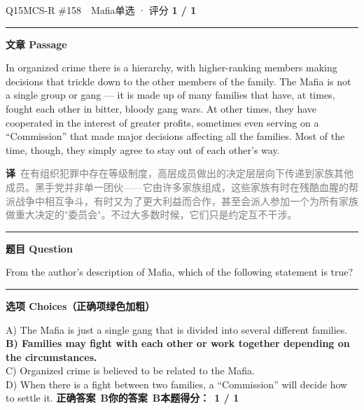 \documentclass[11pt]{article}
\newcommand{\ptesub}[1]{%
  \par\needspace{2\baselineskip}\smallskip
  {\color{cAccent}\rule[-0.2ex]{3pt}{1.05em}}\hspace{6pt}%
  {\bfseries\color{cHead}#1}\par\nopagebreak\smallskip}
\newcommand{\zh}[1]{{\footnotesize\textcolor{cNote}{\textbf{译}}\ \textcolor{gray}{#1}}}
\begin{document}
\begin{qblock}{Q15\quad MCS-R \#158\ \ Mafia}{单选 · 评分 \textcolor{cAccent}{\bfseries 1 / 1}}
\ptesub{文章 Passage}
\begin{promptbox}
In organized crime there is a hierarchy, with higher-ranking members making decisions that trickle down to the other members of the family. The Mafia is not a single group or gang --- it is made up of many families that have, at times, fought each other in bitter, bloody gang wars. At other times, they have cooperated in the interest of greater profits, sometimes even serving on a ``Commission'' that made major decisions affecting all the families. Most of the time, though, they simply agree to stay out of each other's way.
\end{promptbox}
\zh{在有组织犯罪中存在等级制度，高层成员做出的决定层层向下传递到家族其他成员。黑手党并非单一团伙——它由许多家族组成，这些家族有时在残酷血腥的帮派战争中相互争斗，有时又为了更大利益而合作，甚至会派人参加一个为所有家族做重大决定的"委员会"。不过大多数时候，它们只是约定互不干涉。}
\ptesub{题目 Question}
\begin{notebox}From the author's description of Mafia, which of the following statement is true?\end{notebox}
\ptesub{选项 Choices（正确项绿色加粗）}
{\small
A) The Mafia is just a single gang that is divided into several different families.\\
{\color{cFix}\textbf{B) Families may fight with each other or work together depending on the circumstances.}}\\
C) Organized crime is believed to be related to the Mafia.\\
D) When there is a fight between two families, a ``Commission'' will decide how to settle it.}
\smallskip
\textbf{正确答案}\ \textcolor{cFix}{\bfseries B}\qquad\textbf{你的答案}\ \textcolor{cFix}{\bfseries B}\qquad\textbf{本题得分：}\ {\color{cAccent}\bfseries 1 / 1}
\end{qblock}
\end{document}
